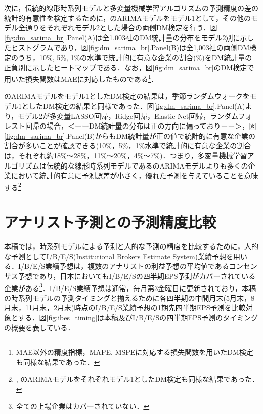 \documentclass[a4paper，12pt]{jsarticle}
\begin{document}
次に，伝統的線形時系列モデルと多変量機械学習アルゴリズムの予測精度の差の統計的有意性を検定するために，\cite{brown1979univariate}のARIMAモデルをモデル1として，その他のモデル全通りをそれぞれモデル2とした場合の両側DM検定を行う．図\ref{fig:dm_sarima_br}.Panel(A)は全1,003社のDM統計量の分布をモデル2別に示したヒストグラムであり，図\ref{fig:dm_sarima_br}.Panel(B)は全1,003社の両側DM検定のうち，10\%, 5\%, 1\%の水準で統計的に有意な企業の割合(\%)をDM統計量の正負別に示したヒートマップである．なお，図\ref{fig:dm_sarima_br}のDM検定で用いた損失関数はMAEに対応したものである\footnote{MAE以外の精度指標，MAPE, MSPEに対応する損失関数を用いたDM検定も同様な結果であった．}．

\cite{brown1979univariate}のARIMAモデルをモデル1としたDM検定の結果は，季節ランダムウォークをモデル1としたDM検定の結果と同様であった．図\ref{fig:dm_sarima_br}.Panel(A)より，モデル2が多変量LASSO回帰，Ridge回帰，Elastic Net回帰，ランダムフォレスト回帰の場合，＜ーーDM統計量の分布は正の方向に偏っておりーー＞，図\ref{fig:dm_sarima_br}.Panel(B)からもDM統計量が正の値で統計的に有意な企業の割合が多いことが確認できる(10\%，5\%，1\%水準で統計的に有意な企業の割合は，それぞれ約18\%～28\%，11\%～20\%，4\%～7\%)．つまり，多変量機械学習アルゴリズムは伝統的な線形時系列モデルである\cite{brown1979univariate}のARIMAモデルよりも多くの企業において統計的有意に予測誤差が小さく，優れた予測を与えていることを意味する\footnote{\cite{foster1977quarterly}, \cite{griffin1977time}のARIMAモデルをそれぞれモデル1としたDM検定も同様な結果であった．}

\section{アナリスト予測との予測精度比較}

本稿では，時系列モデルによる予測と人的な予測の精度を比較するために，人的な予測としてI/B/E/S(Institutional Brokers Estimate System)業績予想を用いる．I/B/E/S業績予想は，複数のアナリストの利益予想の平均値であるコンセンサス予想であり，日本においてもI/B/E/Sの四半期EPS予測がカバーされている企業がある\footnote{全ての上場企業はカバーされていない．}．I/B/E/S業績予想は通常，毎月第3金曜日に更新されており，本稿の時系列モデルの予測タイミングと揃えるために各四半期の中間月末(5月末，8月末，11月末，2月末)時点のI/B/E/S業績予想の1期先四半期EPS予測を比較対象とする．図\ref{fig:ibes_timing}は本稿及びI/B/E/Sの四半期EPS予測のタイミングの概要を表している．
\end{document}

